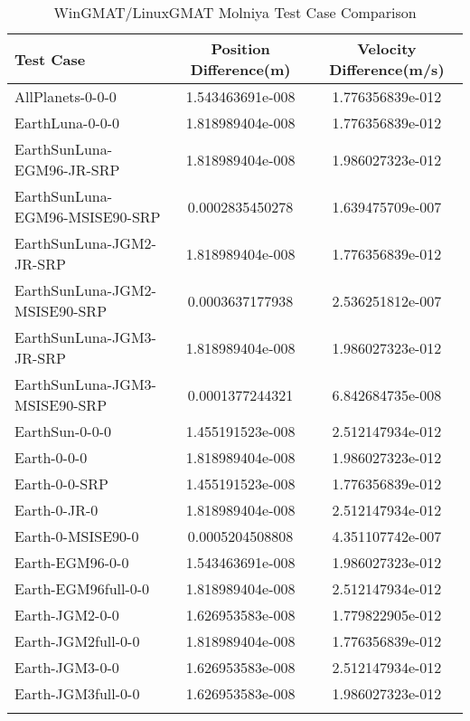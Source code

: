\begin{table}[htbp!]
\centering
\caption{ WinGMAT/LinuxGMAT Molniya Test Case Comparison}
      \begin{tabular}{lcc}
      \hline\hline
          Test Case & Position Difference(m) & Velocity Difference(m/s) \\
         \hline
         AllPlanets-0-0-0 & 1.543463691e-008 & 1.776356839e-012 \\
         EarthLuna-0-0-0 & 1.818989404e-008 & 1.776356839e-012 \\
         EarthSunLuna-EGM96-JR-SRP & 1.818989404e-008 & 1.986027323e-012 \\
         EarthSunLuna-EGM96-MSISE90-SRP & 0.0002835450278 & 1.639475709e-007 \\
         EarthSunLuna-JGM2-JR-SRP & 1.818989404e-008 & 1.776356839e-012 \\
         EarthSunLuna-JGM2-MSISE90-SRP & 0.0003637177938 & 2.536251812e-007 \\
         EarthSunLuna-JGM3-JR-SRP & 1.818989404e-008 & 1.986027323e-012 \\
         EarthSunLuna-JGM3-MSISE90-SRP & 0.0001377244321 & 6.842684735e-008 \\
         EarthSun-0-0-0 & 1.455191523e-008 & 2.512147934e-012 \\
         Earth-0-0-0 & 1.818989404e-008 & 1.986027323e-012 \\
         Earth-0-0-SRP & 1.455191523e-008 & 1.776356839e-012 \\
         Earth-0-JR-0 & 1.818989404e-008 & 2.512147934e-012 \\
         Earth-0-MSISE90-0 & 0.0005204508808 & 4.351107742e-007 \\
         Earth-EGM96-0-0 & 1.543463691e-008 & 1.986027323e-012 \\
         Earth-EGM96full-0-0 & 1.818989404e-008 & 2.512147934e-012 \\
         Earth-JGM2-0-0 & 1.626953583e-008 & 1.779822905e-012 \\
         Earth-JGM2full-0-0 & 1.818989404e-008 & 1.776356839e-012 \\
         Earth-JGM3-0-0 & 1.626953583e-008 & 2.512147934e-012 \\
         Earth-JGM3full-0-0 & 1.626953583e-008 & 1.986027323e-012 \\
      \hline\hline
      \label{Table: Molniya WinGMAT-LinuxGMAT Table} 
\end{tabular}
\end{table}
